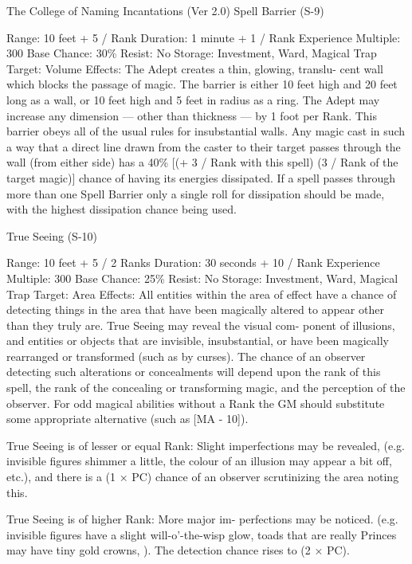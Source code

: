\begin{Chapter}{The College of Naming Incantations (Ver 2.0)}
Spell Barrier (S-9) 

Range: 10 feet + 5 / Rank 
Duration: 1 minute + 1 / Rank 
Experience Multiple: 300 
Base Chance: 30\% 
Resist: No 
Storage: Investment, Ward, Magical Trap 
Target: Volume 
Effects: The Adept creates a thin, glowing, translu-
cent  wall  which blocks  the  passage  of  magic.  The 
barrier  is  either  10  feet  high and 20 feet  long  as  a 
wall, or 10 feet high and 5 feet in radius as a ring. 
The  Adept  may  increase  any  dimension  —  other 
than thickness — by 1 foot per Rank. This barrier 
obeys all  of the usual rules for insubstantial walls. 
Any  magic  cast  in  such  a  way  that  a  direct  line 
drawn from the caster to their target passes through 
the wall (from either side) has a 40\% [(+ 3 / Rank 
with  this  spell)  (3  /  Rank  of  the  target  magic)] 
chance  of  having  its  energies  dissipated.  If  a  spell 
passes through more than one Spell  Barrier only a 
single roll for dissipation should be made, with the 
highest dissipation chance being used. 

True Seeing (S-10) 

Range: 10 feet + 5 / 2 Ranks 
Duration: 30 seconds + 10 / Rank 
Experience Multiple: 300 
Base Chance: 25\% 
Resist: No 
Storage: Investment, Ward, Magical Trap 
Target: Area 
Effects: All entities within the area of effect have a 
chance  of  detecting  things  in  the  area  that  have 
been  magically  altered  to  appear  other  than  they 
truly  are.  True  Seeing  may  reveal  the  visual  com-
ponent  of  illusions, and  entities  or  objects  that  are 
invisible,  insubstantial,  or  have  been  magically 
rearranged or transformed (such as by curses). The 
chance of an observer detecting such alterations or 
concealments  will  depend  upon  the  rank  of  this 
spell,  the  rank  of  the  concealing  or  transforming 
magic, and the perception of the observer. For odd 
magical  abilities  without  a  Rank  the  GM  should 
substitute  some  appropriate  alternative  (such  as 
[MA - 10]). 

True  Seeing  is  of  lesser  or  equal  Rank:  Slight 
imperfections  may  be  revealed,  (e.g.  invisible 
figures  shimmer  a  little,  the  colour  of  an  illusion 
may appear a bit off, etc.), and there is a (1 × PC) 
chance  of  an  observer  scrutinizing  the  area  noting 
this. 

True  Seeing  is  of  higher  Rank:  More  major  im-
perfections  may  be  noticed.  (e.g.  invisible  figures 
have  a  slight  will-o’-the-wisp  glow,  toads  that  are 
really  Princes  may  have  tiny  gold  crowns,  ).  The 
detection chance rises to (2 × PC). 


\end{Chapter}
